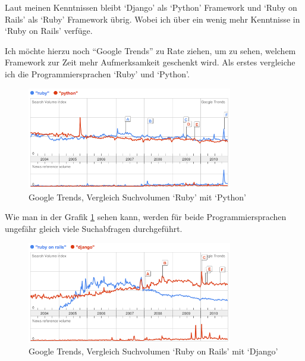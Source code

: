 Laut meinen Kenntnissen bleibt `Django' als `Python' Framework und `Ruby on Rails'
als `Ruby' Framework übrig. Wobei ich über ein wenig mehr Kenntnisse in
`Ruby on Rails' verfüge.

Ich möchte hierzu noch ``Google Trends'' \cite{googletrends} zu Rate ziehen, um zu sehen, welchem
Framework zur Zeit mehr Aufmerksamkeit geschenkt wird. Als erstes vergleiche ich
die Programmiersprachen `Ruby' und `Python'.

\begin{figure}[h]
    \begin{center}
        \includegraphics[width=0.8\textwidth,angle=0]{./bilder/ruby_vs_python.png}
        \caption{Google Trends, Vergleich Suchvolumen `Ruby' mit `Python'}
        \label{ruby_vs_python}
    \end{center}
\end{figure}

Wie man in der Grafik \ref{ruby_vs_python} sehen kann, werden für beide Programmiersprachen
ungefähr gleich viele Suchabfragen durchgeführt.

\begin{figure}[ht]
    \begin{center}
        \includegraphics[width=0.8\textwidth,angle=0]{./bilder/ruby_on_rails_vs_django.png}
        \caption{Google Trends, Vergleich Suchvolumen `Ruby on Rails' mit `Django'}
        \label{ruby_on_rails_vs_django}
    \end{center}
\end{figure}

